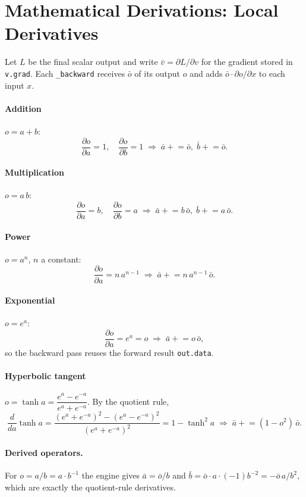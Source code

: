 \documentclass[11pt,a4paper]{article}
\begin{document}
\section{Mathematical Derivations: Local Derivatives}
Let $L$ be the final scalar output and write $\bar{v} = \partial L/\partial v$ for the gradient stored in
\texttt{v.grad}. Each \texttt{\_backward} receives $\bar{o}$ of its output $o$ and adds
$\bar{o}\cdot \partial o/\partial x$ to each input $x$.

\paragraph{Addition} $o = a + b$:
\[
\frac{\partial o}{\partial a} = 1,\quad \frac{\partial o}{\partial b} = 1
\;\Longrightarrow\; \bar a \mathrel{+}= \bar o,\; \bar b \mathrel{+}= \bar o .
\]
\paragraph{Multiplication} $o = a\,b$:
\[
\frac{\partial o}{\partial a} = b,\quad \frac{\partial o}{\partial b} = a
\;\Longrightarrow\; \bar a \mathrel{+}= b\,\bar o,\; \bar b \mathrel{+}= a\,\bar o .
\]
\paragraph{Power} $o = a^n$, $n$ a constant:
\[
\frac{\partial o}{\partial a} = n\,a^{n-1} \;\Longrightarrow\; \bar a \mathrel{+}= n\,a^{n-1}\,\bar o .
\]
\paragraph{Exponential} $o = e^{a}$:
\[
\frac{\partial o}{\partial a} = e^{a} = o \;\Longrightarrow\; \bar a \mathrel{+}= o\,\bar o ,
\]
so the backward pass reuses the forward result \texttt{out.data}.
\paragraph{Hyperbolic tangent} $o = \tanh a = \dfrac{e^{a}-e^{-a}}{e^{a}+e^{-a}}$. By the quotient rule,
\[
\frac{d}{da}\tanh a = \frac{(e^{a}+e^{-a})^2 - (e^{a}-e^{-a})^2}{(e^{a}+e^{-a})^2} = 1 - \tanh^2 a
\;\Longrightarrow\; \bar a \mathrel{+}= (1 - o^2)\,\bar o .
\]
\paragraph{Derived operators.} For $o = a/b = a\cdot b^{-1}$ the engine gives
$\bar a = \bar o / b$ and $\bar b = \bar o \cdot a\cdot(-1)b^{-2} = -\bar o\,a/b^2$, which are exactly the quotient-rule derivatives.
\end{document}
